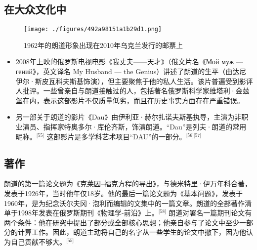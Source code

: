\subsection{在大众文化中}
\begin{figure}[ht]
\centering
\texttt{[image: ./figures/492a98151a1b29d1.png]}
\caption{1962年的朗道形象出现在2010年乌克兰发行的邮票上} \label{fig_LFLD_7}
\end{figure}
\begin{itemize}
\item 2008年上映的俄罗斯电视电影《我丈夫——天才》（俄文片名《Мой муж — гений》，英文译名 My Husband — the Genius）讲述了朗道的生平（由达尼伊尔·斯皮瓦科夫斯基饰演），但主要聚焦于他的私人生活。该片普遍受到影评人批评。一些曾亲自与朗道接触过的人，包括著名俄罗斯科学家维塔利·金兹堡在内，表示这部影片不仅质量低劣，而且在历史事实方面存在严重错误。
\item 另一部关于朗道的影片《Dau》由伊利亚·赫尔扎诺夫斯基执导，主演为非职业演员、指挥家特奥多尔·库伦齐斯，饰演朗道。“Dau”是列夫·朗道的常用昵称。\(^\text{[55]}\)
这部影片是多学科艺术项目“DAU”的一部分。\(^\text{[56][57]}\)
\end{itemize}
\subsection{著作}
朗道的第一篇论文题为《克莱因–福克方程的导出》，与德米特里·伊万年科合著，发表于1926年，当时他年仅18岁。他的最后一篇论文题为《基本问题》，发表于1960年，是为纪念沃尔夫冈·泡利而编辑的文集中的一篇文章。朗道的全部著作清单于1998年发表在俄罗斯期刊《物理学-前沿》上。\(^\text{[58]}\)
朗道对署名一篇期刊论文有两个条件：他在研究中提出了部分或全部核心思想；他亲自参与了论文中至少一部分的计算工作。因此，朗道主动将自己的名字从一些学生的论文中撤下，因为他认为自己贡献不够大。\(^\text{[55]}\)
